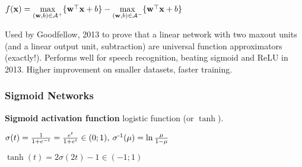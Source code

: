         \tab$f(\mathbf x)=\max\limits_{(\mathbf w,b)\in\mathcal{A}^+}\{\mathbf w^{\mathop{\mathrm{\top}}}\mathbf x+b\}-\max\limits_{(\mathbf w,b)\in\mathcal{A}^-}\{\mathbf w^{\mathop{\mathrm{\top}}}\mathbf x+b\}$
        
        Used by Goodfellow, 2013 to prove that a linear network with two maxout units (and a linear output unit, subtraction) are universal function approximators (exactly!). Performs well for speech recognition, beating sigmoid and ReLU in 2013. Higher improvement on smaller datasets, faster training.
        
    
    \subsubsection{Sigmoid Networks}
    \label{ssub:sigmoidnets}
        \textbf{Sigmoid activation function} logistic function (or $\tanh$).
        
        \tab$\sigma(t)=\frac{1}{1+e^{-t}}=\frac{e^{t}}{1+e^{t}}\in(0;1),\>\sigma^{\text{-}1}(\mu)=\ln{\frac{\mu}{1-\mu}}$
        
        \tab$\tanh(t)=2\sigma(2t)-1\in(-1;1)$
        
        
